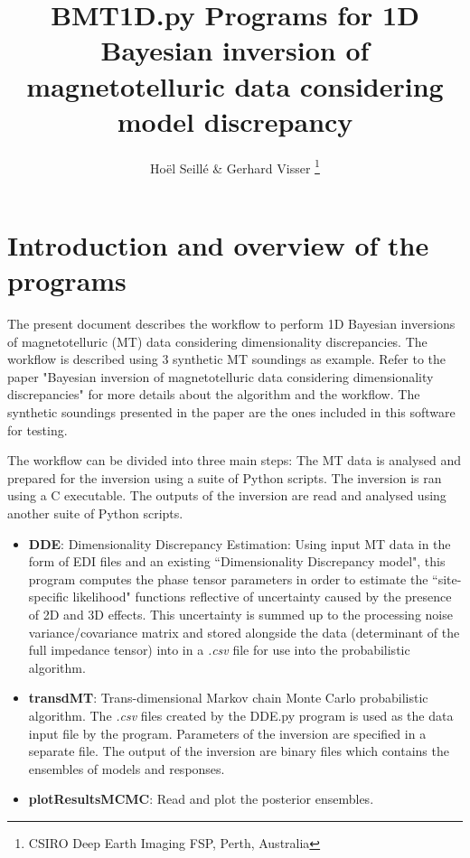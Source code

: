 \documentclass[]{scrartcl}
\title{BMT1D.py  Programs for 1D Bayesian inversion of magnetotelluric data considering model discrepancy}
\author{Ho\"{e}l Seill\'{e} \& Gerhard Visser \thanks{CSIRO Deep Earth Imaging FSP, Perth, Australia}}
\begin{document}
	
	\maketitle

	\section{Introduction and overview of the programs}
	
	The present document describes the workflow to perform 1D Bayesian inversions of magnetotelluric (MT) data considering dimensionality discrepancies. The workflow is described using 3 synthetic MT soundings as example. Refer to the paper "Bayesian inversion of magnetotelluric data considering dimensionality discrepancies" \citep{Seille2020a} for more details about the algorithm and the workflow. The synthetic soundings presented in the paper are the ones included in this software for testing. 
	
	The workflow can be divided into three main steps: The MT data is analysed and prepared for the inversion using a suite of Python scripts. The inversion is ran using a C executable. The outputs of the inversion are read and analysed using another suite of Python scripts.
	
	\begin{itemize}
		\item \textbf{DDE}: Dimensionality Discrepancy Estimation: Using input MT data in the form of EDI files and an existing ``Dimensionality Discrepancy model", this program computes the phase tensor parameters in order to estimate the ``site-specific likelihood" functions reflective of uncertainty caused by the presence of 2D and 3D effects. This uncertainty is summed up to the processing noise variance/covariance matrix and stored alongside the data (determinant of the full impedance tensor) into in a \textit{.csv} file for use into the probabilistic algorithm.
		
		\item \textbf{transdMT}: Trans-dimensional Markov chain Monte Carlo probabilistic algorithm. The  \textit{.csv} files created by the DDE.py program is used as the data input file by the program. Parameters of the inversion are specified in a separate file. The output of the inversion are binary files which contains the ensembles of models and responses. 
		
		\item \textbf{plotResultsMCMC}: Read and plot the posterior ensembles. 

	\end{itemize}
		
\end{document}
